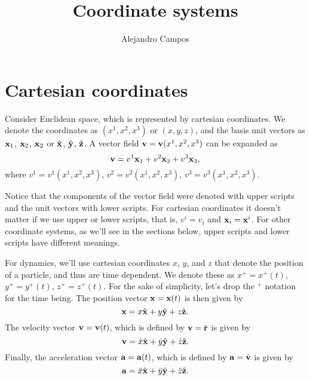 \documentclass[11pt]{article}
\title{Coordinate systems}
\author{Alejandro Campos}
\begin{document}
\maketitle
\tableofcontents

\section{Cartesian coordinates}
Consider Euclidean space, which is represented by cartesian coordinates. We denote the coordinates as $(x^1,x^2,x^3)$ or $(x,y,z)$, and the basis unit vectors as $\mathbf{x}_1$, $\mathbf{x}_2$, $\mathbf{x}_2$ or $\hat{\mathbf{x}}$, $\hat{\mathbf{y}}$, $\hat{\mathbf{z}}$. A vector field $\mathbf{v} = \mathbf{v}(x^1, x^2, x^3)$ can be expanded as 
\begin{equation}
    \label{eq:vector_cartesian}
    \mathbf{v} = v^1 \mathbf{x}_1 + v^2 \mathbf{x}_2 + v^3 \mathbf{x}_3,
\end{equation}
where $v^1 = v^1(x^1, x^2, x^3)$, $v^2 = v^2(x^1, x^2, x^3)$, $v^3 = v^3(x^1, x^2, x^3)$. 

Notice that the components of the vector field were denoted with upper scripts and the unit vectors with lower scripts. For cartesian coordinates it doesn't matter if we use upper or lower scripts, that is, $v^i = v_i$ and $\mathbf{x}_i=\mathbf{x}^i$. For other coordinate systems, as we'll see in the sections below, upper scripts and lower scripts have different meanings.

For dynamics, we'll use cartesian coordinates $x$, $y$, and $z$ that denote the position of a particle, and thus are time dependent. We denote these as $x^+ = x^+(t)$, $y^+ = y^+(t)$, $z^+ = z^+(t)$. For the sake of simplicity, let's drop the $^+$ notation for the time being. The position vector $\mathbf{x} = \mathbf{x}(t)$ is then given by 
\begin{equation}
    \label{eq:cart_pos}
    \mathbf{x} = x \hat{\mathbf{x}} + y \hat{\mathbf{y}} + z \hat{\mathbf{z}}.
\end{equation}
The velocity vector $\mathbf{v}=\mathbf{v}(t)$, which is defined by $\mathbf{v} = \dot{\mathbf{r}}$ is given by
\begin{equation}
    \label{eq:cart_vel}
    \mathbf{v} = \dot{x} \hat{\mathbf{x}} + \dot{y} \hat{\mathbf{y}} + \dot{z} \hat{\mathbf{z}}.
\end{equation}
Finally, the acceleration vector $\mathbf{a} = \mathbf{a}(t)$, which is defined by $\mathbf{a} = \dot{\mathbf{v}}$ is given by
\begin{equation}
    \label{eq:cart_accl}
    \mathbf{a} = \ddot{x} \hat{\mathbf{x}} + \ddot{y} \hat{\mathbf{y}} + \ddot{z} \hat{\mathbf{z}}.
\end{equation}
\end{document}
